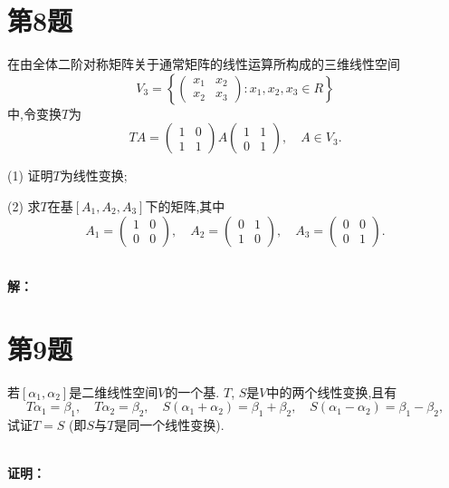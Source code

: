 \documentclass[a4paper, 12pt]{ctexart}
\begin{document}
\section{第8题}
\begin{exercise}
在由全体二阶对称矩阵关于通常矩阵的线性运算所构成的三维线性空间
\[
V_{3}=\left\{
\left(\begin{array}{cc}
x_{1} & x_{2} \\
x_{2} & x_{3}
\end{array}\right) : x_{1}, x_{2}, x_{3} \in R
\right\}
\]
中,令变换$T$为
\[
T A=\left(\begin{array}{cc}
1 & 0 \\
1 & 1
\end{array}\right) A\left(\begin{array}{cc}
1 & 1 \\
0 & 1
\end{array}\right), \quad A \in V_{3}.
\]

(1) 证明$T$为线性变换;

(2) 求$T$在基$\left[A_{1}, A_{2}, A_{3}\right]$下的矩阵,其中
\[
A_{1}=\left(\begin{array}{cc}
1 & 0 \\
0 & 0
\end{array}\right), \quad 
A_{2}=\left(\begin{array}{cc}
0 & 1 \\
1 & 0
\end{array}\right), \quad 
A_{3}=\left(\begin{array}{cc}
0 & 0 \\
0 & 1
\end{array}\right).
\]
\end{exercise}~\\
\noindent\textbf{解：}\\

\section{第9题}
\begin{exercise}
若$\left[\alpha_{1}, \alpha_{2}\right]$是二维线性空间$V$的一个基. $T$, $S$是$V$中的两个线性变换,且有
\[
T\alpha_{1}=\beta_{1}, \quad T\alpha_{2}=\beta_{2}, \quad S(\alpha_{1}+\alpha_{2})=\beta_{1}+\beta_{2}, \quad S(\alpha_{1}-\alpha_{2})=\beta_{1}-\beta_{2},
\]
试证$T=S$ (即$S$与$T$是同一个线性变换).
\end{exercise}~\\
\noindent\textbf{证明：}\\
\end{document}
